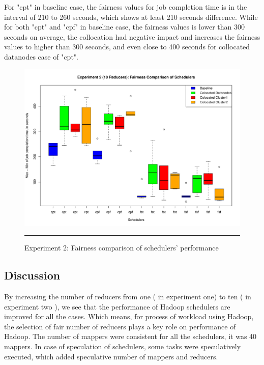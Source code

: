 
 
  For "cpt" in baseline case, the fairness values for job completion time is in the interval of 210 to 260 seconds, which shows at least 210 seconds difference. While for both "cpt" and "cpf" in baseline case, the fairness values is lower than 300 seconds on average, the collocation had negative impact and increases the fairness values to higher than 300 seconds, and even close to 400 seconds for collocated datanodes case of "cpt".
 
 
 \begin{figure}[htbp]
  \centering
    \includegraphics[width=\textwidth,height=\textheight,keepaspectratio]{./Figures/exp_2_max-min.pdf}
    \rule{35em}{0.5pt}
  \caption{Experiment 2: Fairness comparison of schedulers' performance }
  \label{fig:exp_2_max-min}
\end{figure} 
  

\subsection{Discussion}

By increasing the number of reducers from one ( in experiment one) to ten ( in experiment two ), we see that the performance of Hadoop schedulers are improved for all the cases. Which means, for process of workload using Hadoop, the selection of fair number of reducers plays a key role on performance of Hadoop. The number of mappers were consistent for all the schedulers, it was 40 mappers. In case of speculation of schedulers, some tasks were speculatively executed, which added speculative number of mappers and reducers. \\


